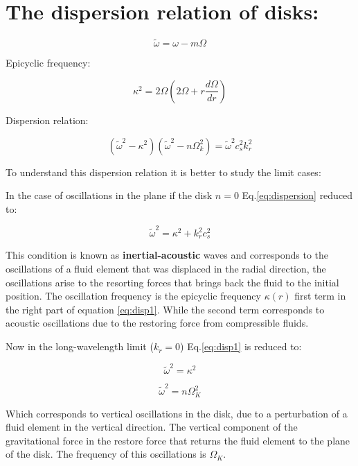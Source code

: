 \section*{The dispersion relation of disks:}

\begin{equation}
\tilde{\omega} = \omega - m\Omega
\end{equation}

Epicyclic frequency:

\begin{equation}
\kappa^2 = 2\Omega \left( 2\Omega + r \dfrac{d\Omega}{dr}  \right)
\end{equation}

Dispersion relation:

\begin{equation}\label{eq:dispersion}
(\tilde{\omega}^2 - \kappa^2)(\tilde{\omega}^2 - n\Omega_k^2) =
\tilde{\omega}^2 c_s^2 k_r^2
\end{equation}

To understand this dispersion relation it is better to study the limit
cases:

In the case of oscillations in the plane if the disk
$n=0$ Eq.\ref{eq:dispersion} reduced to:

\begin{equation}\label{eq:disp1}
\tilde{\omega}^2 = \kappa^2 + k_r^2 c_s^2
\end{equation}

This condition is known as \textbf{inertial-acoustic} waves
and corresponds to the oscillations of a fluid element that was
displaced in the radial direction, the oscillations arise to the
resorting forces that brings back the fluid to the initial position.
The oscillation frequency is the epicyclic frequency $\kappa(r)$ first
term in the right part of equation \ref{eq:disp1}. While the second
term corresponds to acoustic oscillations due to the restoring force
from compressible fluids.

Now in the long-wavelength limit ($k_r=0$) Eq.\ref{eq:disp1} is
reduced to:

\begin{equation}
\tilde{\omega}^2 = \kappa^2
\end{equation}

\begin{equation}
\tilde{\omega}^2 = n \Omega_K^2
\end{equation}

Which corresponds to vertical oscillations in the disk, due to a
perturbation of a fluid element in the vertical direction. The
vertical component of the gravitational force in the restore force
that returns the fluid element to the plane of the disk. The frequency
of this oscillations is $\Omega_K$.

